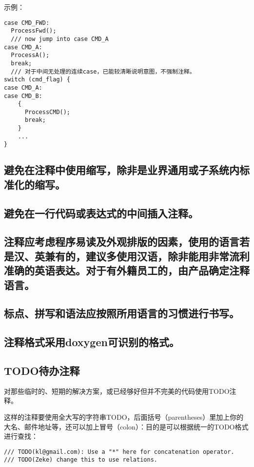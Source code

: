 示例：
\begin{verbatim}
case CMD_FWD:
  ProcessFwd();
  /// now jump into case CMD_A
case CMD_A:
  ProcessA();
  break;
  /// 对于中间无处理的连续case，已能较清晰说明意图，不强制注释。
switch (cmd_flag) {
case CMD_A:
case CMD_B:
    {
      ProcessCMD();
      break;
    }
    ...
}
\end{verbatim}


\subsection{避免在注释中使用缩写，除非是业界通用或子系统内标准化的缩写。}


\subsection{避免在一行代码或表达式的中间插入注释。}


\subsection{注释应考虑程序易读及外观排版的因素，使用的语言若是汉、英兼有的，建议多使用汉语，除非能用非常流利准确的英语表达。对于有外籍员工的，由产品确定注释语言。}


\subsection{标点、拼写和语法应按照所用语言的习惯进行书写。}


\subsection{注释格式采用doxygen可识别的格式。}


\subsection{TODO待办注释}
对那些临时的、短期的解决方案，或已经够好但并不完美的代码使用TODO注释。

这样的注释要使用全大写的字符串TODO，后面括号（parentheses）里加上你的大名、邮件地址等，还可以加上冒号（colon）：目的是可以根据统一的TODO格式进行查找：
\begin{verbatim}
/// TODO(kl@gmail.com): Use a "*" here for concatenation operator.
/// TODO(Zeke) change this to use relations.
\end{verbatim}


